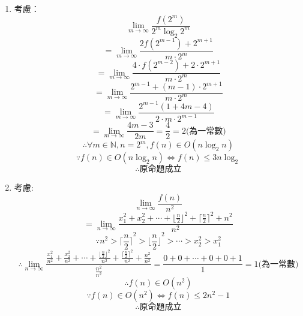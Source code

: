\documentclass[12pt,a4paper]{article}
\begin{document}
\begin{enumerate}
\begin{enumerate}
    \end{enumerate}
    \item 考慮：
    $$\lim_{m \to \infty}\frac{f(2^m)}{2^m\log_2 2^m}$$
    $$=\lim_{m \to \infty}\frac{2f(2^{m-1})+2^{m+1}}{m \cdot 2^m}$$
    $$=\lim_{m \to \infty}\frac{4 \cdot f(2^{m-2})+2\cdot 2^{m+1}}{m \cdot 2^m}$$
    $$=\lim_{m \to \infty}\frac{2^{m-1}+(m-1)\cdot 2^{m+1}}{m \cdot 2^m}$$
    $$=\lim_{m \to \infty}\frac{2^{m-1}(1+4m-4)}{2 \cdot m \cdot 2^{m-1}}$$
    $$=\lim_{m \to \infty}\frac{4m-3}{2m}=\frac{4}{2}=2\textrm{(為一常數)}$$
    $$\therefore \forall m \in \mathbb{N}, n=2^m, f(n) \in O(n\log_2 n)$$
    $$\because f(n)\in O(n\log_2 n) \Longleftrightarrow f(n) \leq 3n\log_2$$
    $$\therefore \textrm{原命題成立}$$

    \item 考慮:
    $$\lim_{n \to \infty}\frac{f(n)}{n^2}$$
    $$=\lim_{n \to \infty}\frac{x_1^2+x_2^2+\cdots+{\lfloor\frac{n}{2}\rfloor}^2+ {\lceil\frac{n}{2}\rceil}^2+n^2}{n^2}$$
    $$\because n^2 > {\lceil\frac{n}{2}\rceil}^2 > {\lfloor\frac{n}{2}\rfloor}^2 > \cdots > x_2^2 > x_1^2$$
    $$\therefore \lim_{n \to \infty}\frac{\frac{x_1^2}{n^2}+\frac{x_2^2}{n^2}+\cdots+\frac{{\lfloor\frac{n}{2}\rfloor}^2}{n^2}+ \frac{{\lceil\frac{n}{2}\rceil}^2}{n^2}+\frac{n^2}{n^2}}{\frac{n^2}{n^2}}=\frac{0+0+\cdots+0+0+1}{1}=1\textrm{(為一常數)}$$
    $$\therefore f(n) \in O(n^2)$$
    $$\because f(n) \in O(n^2) \Longleftrightarrow f(n) \leq 2n^2-1$$
    $$\therefore \textrm{原命題成立}$$
\end{enumerate}
\end{document}
